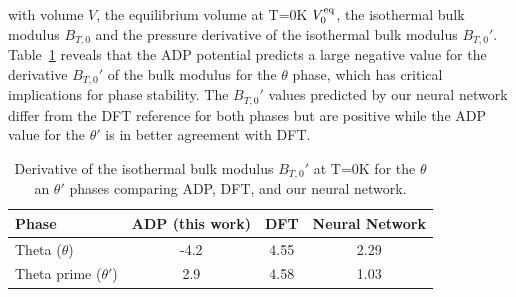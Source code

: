 \documentclass{article}
\begin{document}
with volume $V$, the equilibrium volume at T=0K $V^{\rm eq}_0$, the isothermal bulk modulus $B_{T,0}$ and the pressure derivative of the isothermal bulk modulus $B_{T,0}'$. Table~\ref{albert_tab1} reveals that the ADP potential predicts a large negative value for the derivative $B_{T,0}'$ of the bulk modulus for the $\theta$ phase, which has critical implications for phase stability. The $B_{T,0}'$ values predicted by our neural network differ from the DFT reference for both phases but are positive while the ADP value for the $\theta'$ is in better agreement with DFT.

\begin{table}[H]
    \caption{Derivative of the isothermal bulk modulus $B_{T,0}'$ at T=0K  for the $\theta$ an $\theta'$ phases comparing ADP, DFT, and our neural network.}
\begin{tabular}{lccc}
\hline
\hline
Phase        & ADP (this work)          & DFT        & Neural Network \\ 
\hline 
Theta ($\theta$)        & -4.2      & 4.55     & 2.29  \\
Theta prime ($\theta'$)        & 2.9    & 4.58 & 1.03 \\      
\hline
\hline
\end{tabular}
\label{albert_tab1}
\end{table}


\end{document}
